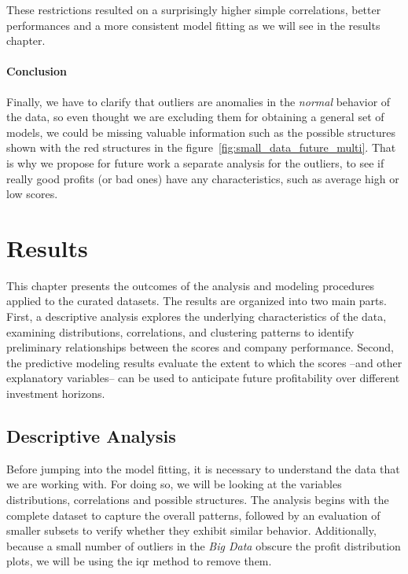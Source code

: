 \documentclass[11pt,english,a4paper,hidelinks]{book}
\begin{document}
\noindent These restrictions resulted on a surprisingly higher simple correlations, better performances and a more consistent model fitting as we will see in the results chapter.

\subsubsection{Conclusion}

\noindent Finally, we have to clarify that outliers are anomalies in the \textit{normal} behavior of the data, so even thought we are excluding them for obtaining a general set of models, we could be missing valuable information such as the possible structures shown with the red structures in the figure~\ref{fig:small_data_future_multi}. That is why we propose for future work a separate analysis for the outliers, to see if really good profits (or bad ones) have any characteristics, such as average high or low scores.

\chapter{Results}
This chapter presents the outcomes of the analysis and modeling procedures applied to the curated datasets. The results are organized into two main parts. First, a descriptive analysis explores the underlying characteristics of the data, examining distributions, correlations, and clustering patterns to identify preliminary relationships between the scores and company performance. Second, the predictive modeling results evaluate the extent to which the scores --and other explanatory variables-- can be used to anticipate future profitability over different investment horizons.

\section{Descriptive Analysis}

Before jumping into the model fitting, it is necessary to understand the data that we are working with. For doing so, we will be looking at the variables distributions, correlations and possible structures. The analysis begins with the complete dataset to capture the overall patterns, followed by an evaluation of smaller subsets to verify whether they exhibit similar behavior. Additionally, because a small number of outliers in the \textit{Big Data} obscure the profit distribution plots, we will be using the \acrshort{iqr} method to remove them.
\end{document}
